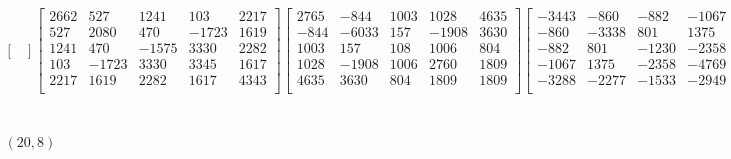 \documentclass[12pt]{amsart}
\theoremstyle{plain}
\theoremstyle{definition}
\begin{document}
\begin{landscape}
\begin{align*}
\begin{bmatrix}
\end{bmatrix}
\begin{bmatrix}
2662  &   527  &   1241  &   103  &   2217  \\ 
 527  &   2080  &   470  &   -1723  &   1619  \\ 
 1241  &   470  &   -1575  &   3330  &   2282  \\ 
 103  &   -1723  &   3330  &   3345  &   1617  \\ 
 2217  &   1619  &   2282  &   1617  &   4343  \\ 
\end{bmatrix}
\begin{bmatrix}
2765  &   -844  &   1003  &   1028  &   4635  \\ 
 -844  &   -6033  &   157  &   -1908  &   3630  \\ 
 1003  &   157  &   108  &   1006  &   804  \\ 
 1028  &   -1908  &   1006  &   2760  &   1809  \\ 
 4635  &   3630  &   804  &   1809  &   1809  \\ 
\end{bmatrix}
\begin{bmatrix}
-3443  &   -860  &   -882  &   -1067  &   -3288  \\ 
 -860  &   -3338  &   801  &   1375  &   -2277  \\ 
 -882  &   801  &   -1230  &   -2358  &   -1533  \\ 
 -1067  &   1375  &   -2358  &   -4769  &   -2949  \\ 
 -3288  &   -2277  &   -1533  &   -2949  &   -5850  \\ 
\end{bmatrix}
\\
(20,8) &:
\begin{bmatrix}
-1059  &   1076  &   1209  &   -3580  &   1688  \\ 
 1076  &   1880  &   -4328  &   5476  &   5316  \\ 
 1209  &   -4328  &   8904  &   1919  &   2137  \\ 
 -3580  &   5476  &   1919  &   -6532  &   -1136  \\ 
 1688  &   5316  &   2137  &   -1136  &   1024  \\ 
\end{bmatrix}
\begin{bmatrix}
-2640  &   499  &   1146  &   -1190  &   457  \\ 
 499  &   1671  &   -2171  &   2031  &   4035  \\ 

\end{bmatrix}
\end{align*}
\end{landscape}
\end{document}
